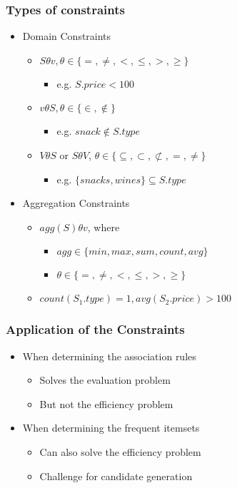 \documentclass[../notes.tex]{subfiles}
\begin{document}
\subsubsection{Types of constraints}
\begin{itemize}
  \item Domain Constraints
    \begin{itemize}
      \item $S \theta v, \theta \in \{=, \ne, <, \le, >, \ge\}$
      \begin{itemize}
        \item e.g. $S.price < 100$
      \end{itemize}

      \item $v \theta S, \theta \in \{\in, \notin\}$
      \begin{itemize}
        \item e.g. $snack \notin S.type$
      \end{itemize}

      \item $V \theta S$ or $S \theta V$, $\theta \in \{\subseteq, \subset, \not\subset, =, \ne\}$
      \begin{itemize}
        \item e.g. $\{snacks, wines\} \subseteq S.type$
      \end{itemize}
    \end{itemize}
  
  \item Aggregation Constraints
    \begin{itemize}
      \item $agg(S) \theta v$, where
      \begin{itemize}
        \item $agg \in \{min, max, sum, count, avg\}$
        \item $\theta \in \{=, \ne, <, \le, >, \ge\}$
      \end{itemize}
      \item $count(S_1.type) = 1, avg(S_2.price) > 100$
    \end{itemize}
\end{itemize}

\subsubsection{Application of the Constraints}
\begin{itemize}
  \item When determining the association rules
    \begin{itemize}
      \item Solves the evaluation problem
      \item But not the efficiency problem
    \end{itemize}
  \item When determining the frequent itemsets
    \begin{itemize}
      \item Can also solve the efficiency problem
      \item Challenge for candidate generation
    \end{itemize}
\end{itemize} 
\end{document}
